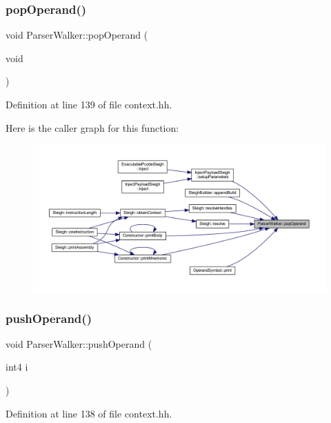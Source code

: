 \subsubsection{\texorpdfstring{popOperand()}{popOperand()}}
{\footnotesize\ttfamily void Parser\+Walker\+::pop\+Operand (\begin{DoxyParamCaption}\item[{void}]{ }\end{DoxyParamCaption})\hspace{0.3cm}{\ttfamily [inline]}}



Definition at line 139 of file context.\+hh.

Here is the caller graph for this function\+:
\nopagebreak
\begin{figure}[H]
\begin{center}
\leavevmode
\includegraphics[width=350pt]{class_parser_walker_a086ef7fa7018c8133d93df96a9dde6d9_icgraph}
\end{center}
\end{figure}
\mbox{\label{class_parser_walker_a0935e6c14cfdcb9657a440cef7ee40ef}} 
\subsubsection{\texorpdfstring{pushOperand()}{pushOperand()}}
{\footnotesize\ttfamily void Parser\+Walker\+::push\+Operand (\begin{DoxyParamCaption}\item[{int4}]{i }\end{DoxyParamCaption})\hspace{0.3cm}{\ttfamily [inline]}}



Definition at line 138 of file context.\+hh.

